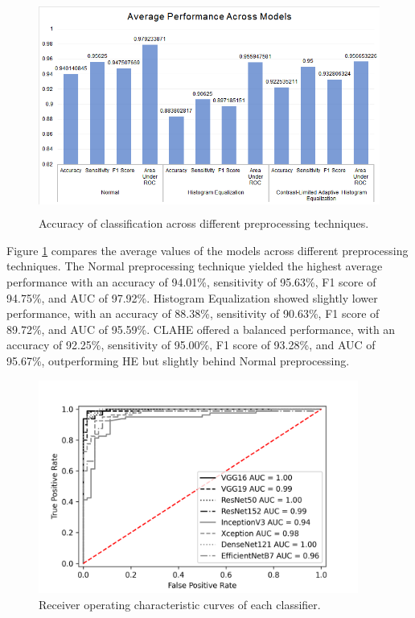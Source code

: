 \documentclass{article}
\begin{document}
\begin{figure}
	\centering
    \includegraphics[height=7cm]{images/performance.png}
	\caption{Accuracy of classification across different preprocessing techniques.}
	\label{fig:fig3}
\end{figure}

Figure \ref{fig:fig3} compares the average values of the models across different preprocessing techniques. The Normal preprocessing technique yielded the highest average performance with an accuracy of 94.01\%, sensitivity of 95.63\%, F1 score of 94.75\%, and AUC of 97.92\%. Histogram Equalization showed slightly lower performance, with an accuracy of 88.38\%, sensitivity of 90.63\%, F1 score of 89.72\%, and AUC of 95.59\%. CLAHE offered a balanced performance, with an accuracy of 92.25\%, sensitivity of 95.00\%, F1 score of 93.28\%, and AUC of 95.67\%, outperforming HE but slightly behind Normal preprocessing.

\begin{figure}
	\centering
    \includegraphics[height=7cm]{images/roc.png}
	\caption{Receiver operating characteristic curves of each classifier.}
	\label{fig:fig4}
\end{figure}
\end{document}

